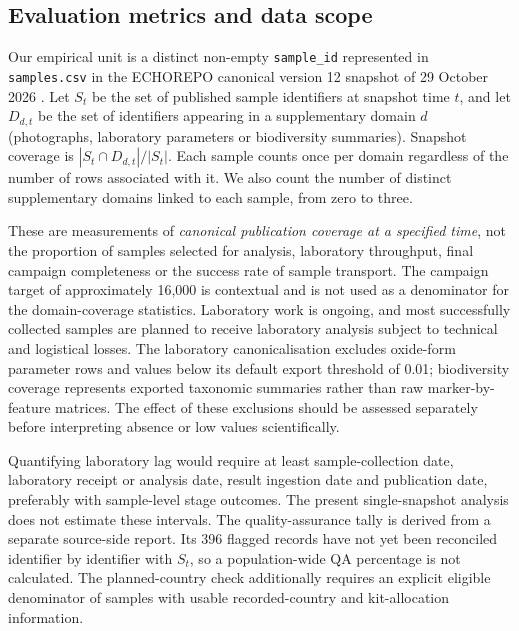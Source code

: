 \documentclass[11pt,a4paper]{article}
\newcommand{\code}[1]{\texttt{#1}}
\begin{document}
\subsection{Evaluation metrics and data scope}
Our empirical unit is a distinct non-empty \code{sample\_id} represented in \code{samples.csv} in the ECHOREPO canonical version 12 snapshot of 29 October 2026 \parencite{echorepo2026dataset}. Let $S_t$ be the set of published sample identifiers at snapshot time $t$, and let $D_{d,t}$ be the set of identifiers appearing in a supplementary domain $d$ (photographs, laboratory parameters or biodiversity summaries). Snapshot coverage is $|S_t\cap D_{d,t}|/|S_t|$. Each sample counts once per domain regardless of the number of rows associated with it. We also count the number of distinct supplementary domains linked to each sample, from zero to three.

These are measurements of \emph{canonical publication coverage at a specified time}, not the proportion of samples selected for analysis, laboratory throughput, final campaign completeness or the success rate of sample transport. The campaign target of approximately 16,000 is contextual and is not used as a denominator for the domain-coverage statistics. Laboratory work is ongoing, and most successfully collected samples are planned to receive laboratory analysis subject to technical and logistical losses. The laboratory canonicalisation excludes oxide-form parameter rows and values below its default export threshold of 0.01; biodiversity coverage represents exported taxonomic summaries rather than raw marker-by-feature matrices. The effect of these exclusions should be assessed separately before interpreting absence or low values scientifically.

Quantifying laboratory lag would require at least sample-collection date, laboratory receipt or analysis date, result ingestion date and publication date, preferably with sample-level stage outcomes. The present single-snapshot analysis does not estimate these intervals. The quality-assurance tally is derived from a separate source-side report. Its 396 flagged records have not yet been reconciled identifier by identifier with $S_t$, so a population-wide QA percentage is not calculated. The planned-country check additionally requires an explicit eligible denominator of samples with usable recorded-country and kit-allocation information.
\end{document}
